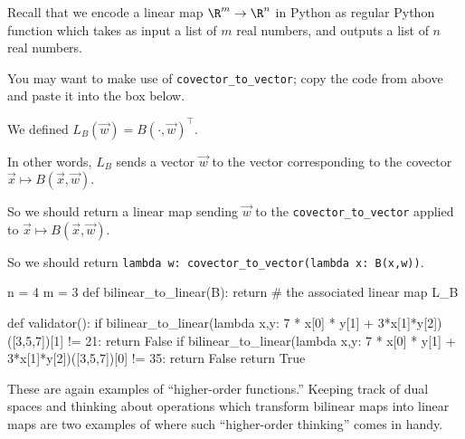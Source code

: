 \documentclass{ximera}
\begin{document}
\begin{question}
  Recall that we encode a linear map $\R^m \to \R^n$ in Python as regular Python function which takes as input a list of $m$ real numbers, and outputs a list of $n$ real numbers.

  \begin{solution}
    \begin{hint}
      You may want to make use of \texttt{covector\_to\_vector}; copy the code from above and paste it into the box below.
    \end{hint}
    \begin{hint}
      We defined $L_B(\vec{w}) = B(\cdot,\vec{w})^\top$.
    \end{hint}
    \begin{hint}
      In other words, $L_B$ sends a vector $\vec{w}$ to the vector corresponding to the covector $\vec{x} \mapsto B(\vec{x},\vec{w})$.
    \end{hint}
    \begin{hint}
      So we should return a linear map sending $\vec{w}$ to the \texttt{covector\_to\_vector} applied to $\vec{x} \mapsto B(\vec{x},\vec{w})$.
    \end{hint}
    \begin{hint}
      So we should return \texttt{lambda w: covector\_to\_vector(lambda x: B(x,w))}.
    \end{hint}
    \begin{python}
n = 4
m = 3
def bilinear_to_linear(B):
  return # the associated linear map L_B

def validator():
  if bilinear_to_linear(lambda x,y: 7 * x[0] * y[1] + 3*x[1]*y[2])([3,5,7])[1] != 21:
    return False
  if bilinear_to_linear(lambda x,y: 7 * x[0] * y[1] + 3*x[1]*y[2])([3,5,7])[0] != 35:
    return False
  return True
    \end{python}
  \end{solution}

  These are again examples of ``higher-order functions.''  Keeping
  track of dual spaces and thinking about operations which transform
  bilinear maps into linear maps are two examples of where such
  ``higher-order thinking'' comes in handy.
\end{question}
\end{document}
